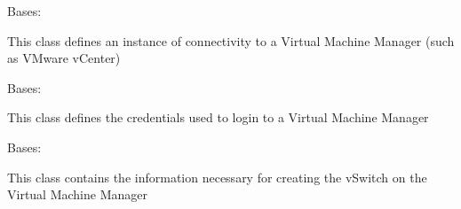 \documentclass[letterpaper,10pt,english]{sphinxmanual}
\begin{document}

\begin{fulllineitems}
\label{acitoolkit:acitoolkit.VMM}
Bases: {\hyperref[acibaseobject:acibaseobject.BaseACIObject]{}}

This class defines an instance of connectivity to a
Virtual Machine Manager (such as VMware vCenter)

\begin{fulllineitems}
\label{acitoolkit:acitoolkit.VMM.get_json}
\end{fulllineitems}


\begin{fulllineitems}
\label{acitoolkit:acitoolkit.VMM.get_path}
\end{fulllineitems}


\end{fulllineitems}


\begin{fulllineitems}
\label{acitoolkit:acitoolkit.VMMCredentials}
Bases: {\hyperref[acibaseobject:acibaseobject.BaseACIObject]{}}

This class defines the credentials used to login to a Virtual
Machine Manager

\begin{fulllineitems}
\label{acitoolkit:acitoolkit.VMMCredentials.get_json}
\end{fulllineitems}


\end{fulllineitems}


\begin{fulllineitems}
\label{acitoolkit:acitoolkit.VMMvSwitchInfo}
Bases: 

This class contains the information necessary for creating the
vSwitch on the Virtual Machine Manager

\end{fulllineitems}
\end{document}
